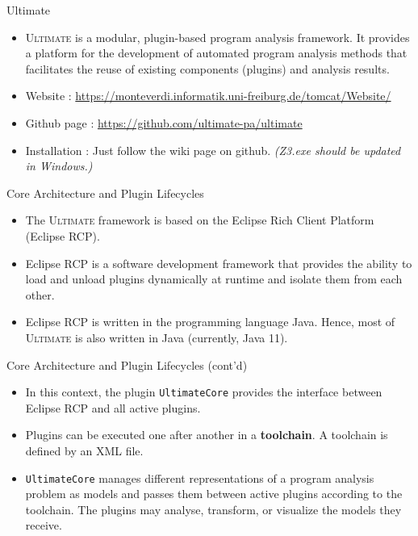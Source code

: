 \documentclass[12pt]{beamer}
\subtitle{(Based on [Daniel Dietsch : Automated verification of system requirements and software specifications. 2016.])}
\author{林宏陽}
\newcommand{\code}[1]{\texttt{#1}}
\newcommand{\Note}[1]{\textsl{\small(#1)}}
\newcommand{\ultimate}{\textsc{Ultimate }}
\begin{document}
\begin{frame}
	\maketitle
\end{frame}

\begin{frame}{Ultimate}
  	\begin{itemize}
		\item \ultimate is a modular, plugin-based program analysis framework. It provides a platform for the development of automated program analysis methods that facilitates the reuse of existing components (plugins) and analysis results.
		\item Website : \url{https://monteverdi.informatik.uni-freiburg.de/tomcat/Website/}
		\item Github page : \url{https://github.com/ultimate-pa/ultimate}
	  	\item Installation : Just follow the wiki page on github. \Note{Z3.exe should be updated in Windows.}
	\end{itemize}
\end{frame}

\begin{frame}{Core Architecture and Plugin Lifecycles}
  	\begin{itemize}
		\item The \ultimate framework is based on the Eclipse Rich Client Platform
	(Eclipse RCP).
		\item Eclipse RCP is a software development framework that provides  the ability to load and unload plugins dynamically at runtime and isolate them from each other.
		\item Eclipse RCP is written in the programming language Java.
		Hence, most of \ultimate is also written in Java (currently, Java 11).
  	\end{itemize}
\end{frame}

\begin{frame}{Core Architecture and Plugin Lifecycles (cont'd)}
	\begin{itemize}
	  	\item  In this context, the plugin \code{UltimateCore} provides the interface between Eclipse RCP and all active plugins.
	  	\item  Plugins can be executed one after another in a \textbf{toolchain}. A toolchain is defined by an XML file.
	  	\item \code{UltimateCore} manages different representations of a program analysis problem as models and passes them between active plugins according to the toolchain. The plugins may analyse, transform, or visualize the models they receive.
	\end{itemize}
\end{frame}
\end{document}
